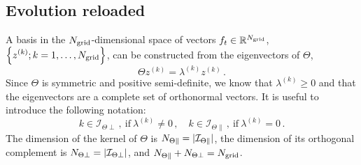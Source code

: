 \documentclass[11pt]{article}
\begin{document}

\subsection{Evolution reloaded}
\label{sec:EvolReload}

A basis in the $N_{\mathrm{grid}}$-dimensional space of vectors $f_t \in \mathbb{R}^{N_{\mathrm{grid}}}$,
$\displaystyle \left\{z^{(k)}; k = 1, \ldots, N_{\mathrm{grid}}\right\}$, can be constructed from the eigenvectors of $\Theta$, 
\begin{equation}
  \label{eq:ThetaEigenVect}
  \Theta z^{(k)} = \lambda^{(k)} z^{(k)}\, .
\end{equation}
Since $\Theta$ is symmetric and positive semi-definite, we know that $\lambda^{(k)}\geq 0$ and that 
the eigenvectors are a complete set of orthonormal vectors. It is useful to introduce the following 
notation: 
\begin{equation}
  \label{eq:KernelIndices}
  k \in \mathcal{I}_{\Theta\perp}\, , ~\text{if}~\lambda^{(k)} \neq 0\, , 
  \quad k \in \mathcal{I}_{\Theta\parallel}\, , ~\text{if}~\lambda^{(k)} = 0\, .
\end{equation}
The dimension of the kernel of $\Theta$ is $N_{\Theta\parallel} = |\mathcal{I}_{\Theta\parallel}|$, the dimension of its orthogonal 
complement is $N_{\Theta\perp}=|\mathcal{I}_{\Theta\perp}|$, and $N_{\Theta\parallel} + N_{\Theta\perp} = N_{\mathrm{grid}}$.
\end{document}
